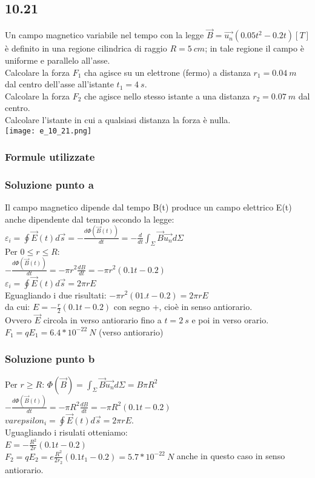 \documentclass[../../main.tex]{subfiles}
\begin{document}
\subsection*{10.21}
Un campo magnetico variabile nel tempo con la legge $\vec{B} = \vec{u_n}(0.05t^2 - 0.2t)[T]$ è definito in una regione cilindrica di raggio $R = 5\ cm$; in tale regione il campo è uniforme e parallelo all'asse.\\
Calcolare la forza $F_1$ cha agisce su un elettrone (fermo) a distanza $r_1 = 0.04\ m$ dal centro dell'asse all'istante $t_1 = 4\ s$.\\
Calcolare la forza $F_2$ che agisce nello stesso istante a una distanza $r_2 = 0.07\ m$ dal centro.\\
Calcolare l'istante in cui a qualsiasi distanza la forza è nulla.\\
\texttt{[image: e\_10\_21.png]}
\subsubsection*{Formule utilizzate}
\subsubsection*{Soluzione punto a}
Il campo magnetico dipende dal tempo B(t) produce un campo elettrico E(t) anche dipendente dal tempo secondo la legge:\\
$\varepsilon_i = \oint\vec{E}(t)d\vec{s}=-\frac{d\Phi(\vec{B}(t))}{dt} = -\frac{d}{dt}\int_\Sigma \vec{B}\vec{u_n}d\Sigma$\\
Per $0\le r\le R$:\\
$-\frac{d\Phi(\vec{B}(t))}{dt} = -\pi r^2\frac{dB}{dt}=-\pi r^2(0.1t - 0.2)$\\
$\varepsilon_i = \oint \vec{E}(t)d\vec{s} = 2\pi rE$\\
Eguagliando i due risultati: $-\pi r^2(01.t-0.2) = 2\pi rE$\\
da cui: $E = -\frac{r}{2} (0.1t-0.2)$ con segno +, cioè in senso antiorario.\\
Ovvero $\vec{E}$ circola in verso antiorario fino a $t = 2\ s$ e poi in verso orario.
$F_1 = qE_1 = 6.4 * 10^{-22}\ N$ (verso antiorario)\\
\subsubsection*{Soluzione punto b}
Per $r \ge R$:
$\Phi(\vec{B}) = \int_\Sigma\vec{B}\vec{u_n}d\Sigma = B\pi R^2$\\
$-\frac{d\Phi(\vec{B}(t))}{dt} = -\pi R^2\frac{dB}{dt} = -\pi R^2(0.1t-0.2)$\\
$varepsilon_i = \oint \vec{E}(t)d\vec{s} = 2\pi rE$.\\
Uguagliando i risulati otteniamo:\\
$E = -\frac{R^2}{2r}(0.1t-0.2)$\\
$F_2 = qE_2 = e\frac{R^2}{2r_2}(0.1t_1 -0.2) =5.7* 10^{-22}\ N$ anche in questo caso in senso antiorario.\\
\end{document}
